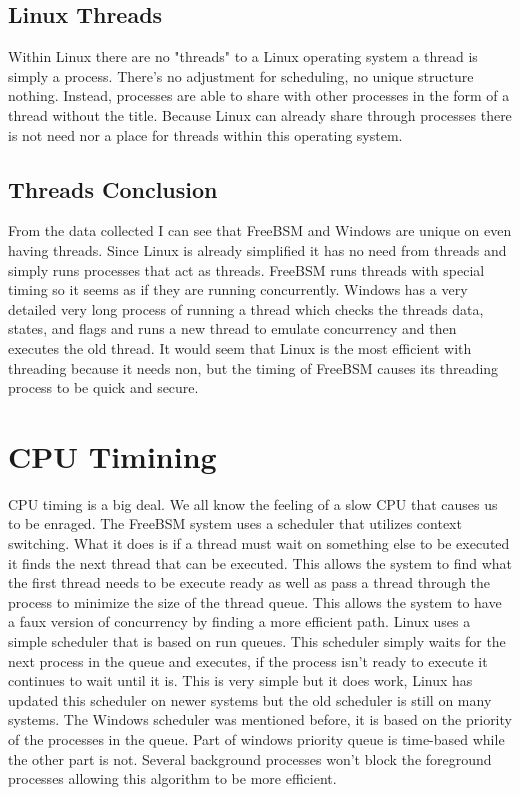 \documentclass[onecolumn, draftclsnofoot,10pt, compsoc]{IEEEtran}
\begin{document}
\subsection{Linux Threads}
Within Linux there are no "threads" to a Linux operating system a thread is simply a process. There's no adjustment for scheduling, no unique structure nothing. Instead, processes are able to share with other processes in the form of a thread without the title. Because Linux can already share through processes there is not need nor a place for threads within this operating system\cite{7}.
\subsection{Threads Conclusion}
From the data collected I can see that FreeBSM and Windows are unique on even having threads. Since Linux is already simplified it has no need from threads and simply runs processes that act as threads. FreeBSM runs threads with special timing so it seems as if they are running concurrently. Windows has a very detailed very long process of running a thread which checks the threads data, states, and flags and runs a new thread to emulate concurrency and then executes the old thread. It would seem that Linux is the most efficient with threading because it needs non, but the timing of FreeBSM causes its threading process to be quick and secure.

\section{CPU Timining}
CPU timing is a big deal. We all know the feeling of a slow CPU that causes us to be enraged. The FreeBSM system uses a scheduler that utilizes context switching. What it does is if a thread must wait on something else to be executed it finds the next thread that can be executed. This allows the system to find what the first thread needs to be execute ready as well as pass a thread through the process to minimize the size of the thread queue\cite{1}. This allows the system to have a faux version of concurrency by finding a more efficient path. Linux uses a simple scheduler that is based on run queues. This scheduler simply waits for the next process in the queue and executes, if the process isn't ready to execute it continues to wait until it is. This is very simple but it does work, Linux has updated this scheduler on newer systems but the old scheduler is still on many systems\cite{8}. The Windows scheduler was mentioned before, it is based on the priority of the processes in the queue. Part of windows priority queue is time-based while the other part is not. Several background processes won't block the foreground processes allowing this algorithm to be more efficient\cite{2}.
\end{document}
